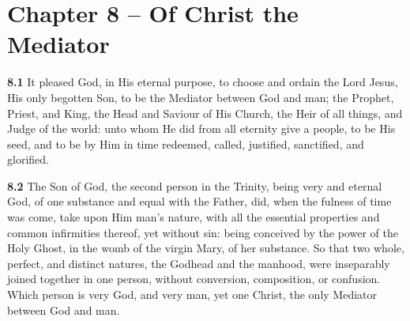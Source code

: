 \section{Chapter 8 -- Of Christ the Mediator}

\par\textbf{8.1} It pleased God, in His eternal purpose, to choose and ordain the Lord Jesus, His only begotten Son, to be the Mediator between God and man; the Prophet, Priest, and King, the Head and Saviour of His Church, the Heir of all things, and Judge of the world: unto whom He did from all eternity give a people, to be His seed, and to be by Him in time redeemed, called, justified, sanctified, and glorified.   

\par\textbf{8.2} The Son of God, the second person in the Trinity, being very and eternal God, of one substance and equal with the Father, did, when the fulness of time was come, take upon Him man's nature, with all the essential properties and common infirmities thereof, yet without sin: being conceived by the power of the Holy Ghost, in the womb of the virgin Mary, of her substance. So that two whole, perfect, and distinct natures, the Godhead and the manhood, were inseparably joined together in one person, without conversion, composition, or confusion. Which person is very God, and very man, yet one Christ, the only Mediator between God and man.   

